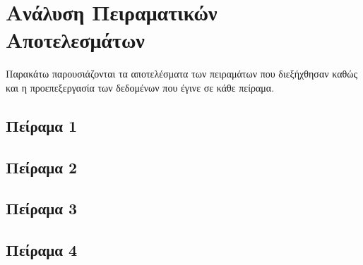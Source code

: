 \section{Ανάλυση Πειραματικών Αποτελεσμάτων}
Παρακάτω παρουσιάζονται τα αποτελέσματα των πειραμάτων που διεξήχθησαν καθώς και η προεπεξεργασία
των δεδομένων που έγινε σε κάθε πείραμα.

\subsection{Πείραμα 1}
\subsection{Πείραμα 2}
\subsection{Πείραμα 3}
\subsection{Πείραμα 4}